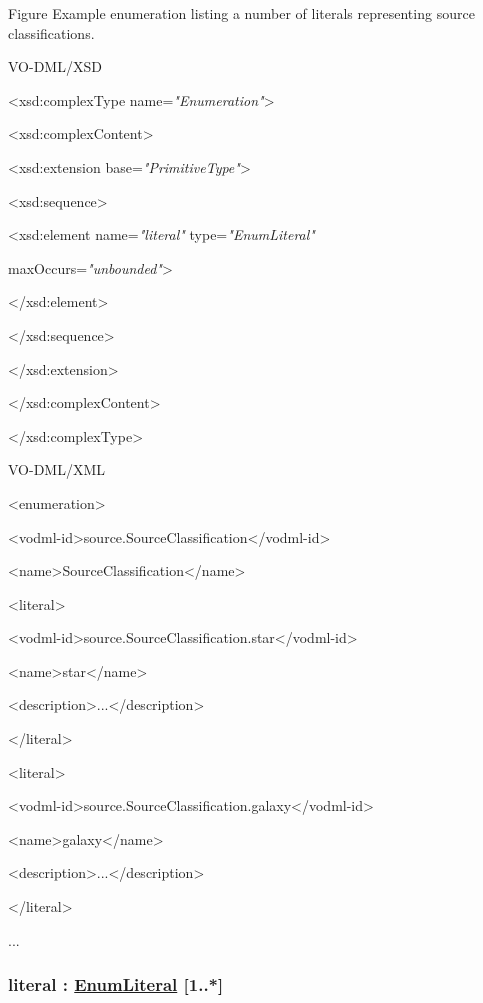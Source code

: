 \documentclass[10pt,a4paper]{ivoa}
\begin{document}
Figure Example enumeration listing a number of literals representing
source classifications.

VO-DML/XSD

\textless xsd:complexType name=\emph{"Enumeration"}\textgreater{}

\textless xsd:complexContent\textgreater{}

\textless xsd:extension base=\emph{"PrimitiveType"}\textgreater{}

\textless xsd:sequence\textgreater{}

\textless xsd:element name=\emph{"literal"} type=\emph{"EnumLiteral"}

maxOccurs=\emph{"unbounded"}\textgreater{}

\textless/xsd:element\textgreater{}

\textless/xsd:sequence\textgreater{}

\textless/xsd:extension\textgreater{}

\textless/xsd:complexContent\textgreater{}

\textless/xsd:complexType\textgreater{}

VO-DML/XML

\textless enumeration\textgreater{}

\textless vodml-id\textgreater source.SourceClassification\textless/vodml-id\textgreater{}

\textless name\textgreater SourceClassification\textless/name\textgreater{}

\textless literal\textgreater{}

\textless vodml-id\textgreater source.SourceClassification.star\textless/vodml-id\textgreater{}

\textless name\textgreater star\textless/name\textgreater{}

\textless description\textgreater...\textless/description\textgreater{}

\textless/literal\textgreater{}

\textless literal\textgreater{}

\textless vodml-id\textgreater source.SourceClassification.galaxy\textless/vodml-id\textgreater{}

\textless name\textgreater galaxy\textless/name\textgreater{}

\textless description\textgreater...\textless/description\textgreater{}

\textless/literal\textgreater{}

...

\hypertarget{literal-enumliteral-1..}{%
\subsubsection{\texorpdfstring{literal :
\protect\hyperlink{enumliteral-extends-referableelement}{EnumLiteral}
{[}1..*{]}}{literal : EnumLiteral {[}1..*{]}}}\label{literal-enumliteral-1..}}
\end{document}
